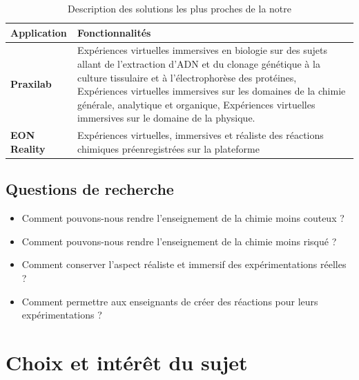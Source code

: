\begin{table}[H]
	\caption{Description des solutions les plus proches de la notre}
	\centering
	\begin{tabular}{|l|p{10cm}|}
		\hline
		\textbf{Application} & \textbf{Fonctionnalités}                                                                                                                                                                                                                                                                                                                           \\ \hline
		\textbf{Praxilab}    & Expériences virtuelles immersives en biologie sur des sujets allant de l'extraction d'ADN et du clonage génétique à la culture tissulaire et à l'électrophorèse des protéines, Expériences virtuelles immersives sur les domaines de la chimie générale, analytique et organique, Expériences virtuelles immersives sur le domaine de la physique. \\ \hline
		\textbf{EON Reality} & Expériences virtuelles, immersives et réaliste des réactions chimiques préenregistrées sur la plateforme                                                                                                                                                                                                                                           \\ \hline
	\end{tabular}
\end{table}



\subsection{Questions de recherche}

\begin{itemize}
	\item Comment pouvons-nous rendre l'enseignement de la chimie moins couteux ?
	\item Comment pouvons-nous rendre l'enseignement de la chimie moins risqué ?
	\item Comment conserver l'aspect réaliste et immersif des expérimentations réelles ?
	\item Comment permettre aux enseignants de créer des réactions pour leurs expérimentations ?
\end{itemize}

\section{Choix et intérêt du sujet}


